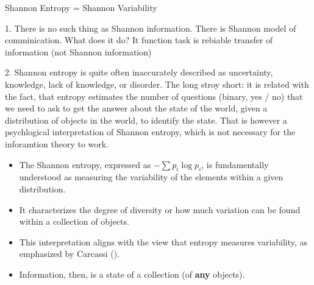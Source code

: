 \documentclass[10pt, aspectratio=169]{beamer}
\begin{document}
\begin{frame}{Shannon Entropy =  Shannon Variability}

    1. There is no such thing as Shannon information. There is Shannon model of comminication.
    What does it do? It function task is rebiable transfer of information (not Shannon information)

    2.  Shannon entropy is quite often inaccurately described as uncertainty, knowledge, lack of knowledge, or disorder. The long stroy short: it is related with the fact, that entropy estimates the number of questions (binary, yes / no) that we need to ask to get the answer about the state of the world, given a distribution of objects in the world, to identify the state. That is however a psychlogical interpretation of Shannon entropy, which is not necessary for the inforamtion theory to work.

    \begin{itemize}
        \item The Shannon entropy, expressed as $- \sum p_i \log p_i$, is fundamentally understood as measuring the variability of the elements within a given distribution. 
        \item It characterizes the degree of diversity or how much variation can be found within a collection of objects.
        \item This interpretation aligns with the view that entropy measures variability, as emphasized by Carcassi (\cite{carcassi_variability_2021}).
        \item Information, then, is a state of a collection (of \textbf{any} objects).
    \end{itemize}
\end{frame}
\end{document}
